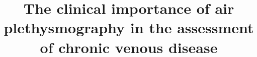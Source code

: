 \documentclass[numberinsection,times,10pt,spreadimages]{memoir}
\begin{document}
\title{The clinical importance of air plethysmography in the assessment of
chronic venous disease}




\maketitle
\end{document}
